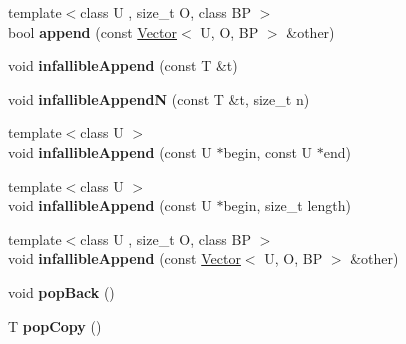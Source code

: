\begin{DoxyCompactItemize}
\item 
\hypertarget{classjs_1_1_vector_a11f18590dcfc862c0d3d25c83f906b0e}{{\footnotesize template$<$class U , size\-\_\-t O, class B\-P $>$ }\\bool {\bfseries append} (const \hyperlink{classjs_1_1_vector}{Vector}$<$ U, O, B\-P $>$ \&other)}\label{classjs_1_1_vector_a11f18590dcfc862c0d3d25c83f906b0e}

\item 
\hypertarget{classjs_1_1_vector_af90df066edf4db743317ce590b4e9273}{void {\bfseries infallible\-Append} (const T \&t)}\label{classjs_1_1_vector_af90df066edf4db743317ce590b4e9273}

\item 
\hypertarget{classjs_1_1_vector_a7049dead24cebcb64b6a594e3851a771}{void {\bfseries infallible\-Append\-N} (const T \&t, size\-\_\-t n)}\label{classjs_1_1_vector_a7049dead24cebcb64b6a594e3851a771}

\item 
\hypertarget{classjs_1_1_vector_addb38bd89f51ab343a76c0e9d48f0a47}{{\footnotesize template$<$class U $>$ }\\void {\bfseries infallible\-Append} (const U $\ast$begin, const U $\ast$end)}\label{classjs_1_1_vector_addb38bd89f51ab343a76c0e9d48f0a47}

\item 
\hypertarget{classjs_1_1_vector_a3607576bca45b162cf94adcdacea7cf0}{{\footnotesize template$<$class U $>$ }\\void {\bfseries infallible\-Append} (const U $\ast$begin, size\-\_\-t length)}\label{classjs_1_1_vector_a3607576bca45b162cf94adcdacea7cf0}

\item 
\hypertarget{classjs_1_1_vector_a4468968b2424fef8bfd860528b690ae8}{{\footnotesize template$<$class U , size\-\_\-t O, class B\-P $>$ }\\void {\bfseries infallible\-Append} (const \hyperlink{classjs_1_1_vector}{Vector}$<$ U, O, B\-P $>$ \&other)}\label{classjs_1_1_vector_a4468968b2424fef8bfd860528b690ae8}

\item 
\hypertarget{classjs_1_1_vector_ad8e2e0e181d936a8bdd2e893b7bcbf27}{void {\bfseries pop\-Back} ()}\label{classjs_1_1_vector_ad8e2e0e181d936a8bdd2e893b7bcbf27}

\item 
\hypertarget{classjs_1_1_vector_a4ecd1ca2a3fcadac05a2a49895f4e478}{T {\bfseries pop\-Copy} ()}\label{classjs_1_1_vector_a4ecd1ca2a3fcadac05a2a49895f4e478}


\end{DoxyCompactItemize}
